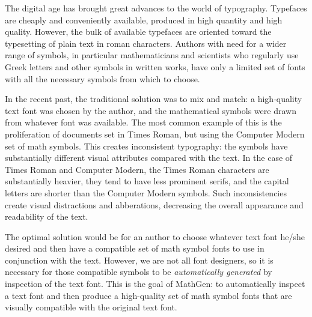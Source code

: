 
The digital age has brought great advances to the world of typography. Typefaces
are cheaply and conveniently available, produced in high quantity and high
quality. However, the bulk of available typefaces are oriented toward the
typesetting of plain text in roman characters. Authors with need for a wider
range of symbols, in particular mathematicians and scientists who regularly use
Greek letters and other symbols in written works, have only a limited set of
fonts with all the necessary symbols from which to choose.

In the recent past, the traditional solution was to mix and match: a
high-quality text font was chosen by the author, and the mathematical symbols
were drawn from whatever font was available. The most common example of this is
the proliferation of documents set in Times Roman, but using the Computer Modern
set of math symbols. This creates inconsistent typography: the symbols have
substantially different visual attributes compared with the text. In the case of
Times Roman and Computer Modern, the Times Roman characters are substantially
heavier, they tend to have less prominent serifs, and the capital letters are
shorter than the Computer Modern symbols. Such inconsistencies create visual
distractions and abberations, decreasing the overall appearance and readability
of the text.

The optimal solution would be for an author to choose whatever text font he/she
desired and then have a compatible set of math symbol fonts to use in
conjunction with the text. However, we are not all font designers, so it is
necessary for those compatible symbols to be \emph{automatically generated} by
inspection of the text font. This is the goal of MathGen: to automatically
inspect a text font and then produce a high-quality set of math symbol fonts
that are visually compatible with the original text font.
